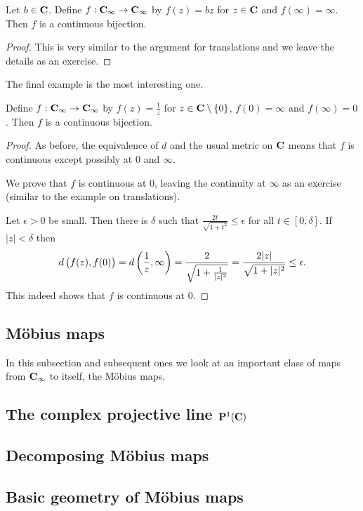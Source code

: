 \begin{example}[Dilations]
Let $b\in\mathbf C$. Define $f:\mathbf C_\infty\to\mathbf C_\infty$ by $f(z)=bz$ for $z\in\mathbf C$ and $f(\infty)=\infty$. Then $f$ is a continuous bijection.
\end{example}

\begin{proof}
This is very similar to the argument for translations and we leave the details as an exercise.
\end{proof}

The final example is the most interesting one.

\begin{example}[Inversion]
Define $f:\mathbf C_\infty\to\mathbf C_\infty$ by $f(z)=\frac{1}{z}$ for $z\in\mathbf C\setminus\{0\}$, $f(0)=\infty$ and $f(\infty)=0$. Then $f$ is a continuous bijection.
\end{example}

\begin{proof}
As before, the equivalence of $d$ and the usual metric on $\mathbf C$ means that $f$ is continuous except possibly at $0$ and $\infty$.

We prove that $f$ is continuous at $0$, leaving the continuity at $\infty$ as an exercise (similar to the example on translations).

Let $\epsilon>0$ be small. Then there is $\delta$ such that $\frac{2t}{\sqrt{1+t^2}}\le\epsilon$ for all $t\in[0,\delta]$. If $|z|<\delta$ then
\[d\left(f(z),f(0)\right)=d\left(\frac{1}{z},\infty\right)=\frac{2}{\sqrt{1+\frac{1}{|z|^2}}}=\frac{2|z|}{\sqrt{1+|z|^2}}\le\epsilon.\]
This indeed shows that $f$ is continuous at $0$.
\end{proof}

\subsection{M\"{o}bius maps}
In this subsection and subsequent ones we look at an important class of maps from $\mathbf C_\infty$ to itself, the M\"{o}bius maps.

\subsection{The complex projective line $\mathbf P^1(\mathbf C)$}
\subsection{Decomposing M\"{o}bius maps}
\subsection{Basic geometry of M\"{o}bius maps}